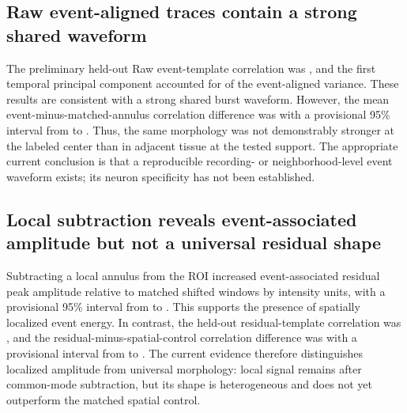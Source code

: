 \subsection{Raw event-aligned traces contain a strong shared waveform}

The preliminary held-out Raw event-template correlation was \RawHeldoutCorrelation{}, and the first temporal principal component accounted for \RawFirstPCVariance{} of the event-aligned variance. These results are consistent with a strong shared burst waveform. However, the mean event-minus-matched-annulus correlation difference was \RawAnnulusDelta{} with a provisional 95\% interval from \RawAnnulusCILow{} to \RawAnnulusCIHigh{}. Thus, the same morphology was not demonstrably stronger at the labeled center than in adjacent tissue at the tested support. The appropriate current conclusion is that a reproducible recording- or neighborhood-level event waveform exists; its neuron specificity has not been established.



\subsection{Local subtraction reveals event-associated amplitude but not a universal residual shape}

Subtracting a local annulus from the ROI increased event-associated residual peak amplitude relative to matched shifted windows by \ResidualPeakAmplitudeDelta{} intensity units, with a provisional 95\% interval from \ResidualPeakAmplitudeCILow{} to \ResidualPeakAmplitudeCIHigh{}. This supports the presence of spatially localized event energy. In contrast, the held-out residual-template correlation was \ResidualHeldoutCorrelation{}, and the residual-minus-spatial-control correlation difference was \ResidualSpatialDelta{} with a provisional interval from \ResidualSpatialCILow{} to \ResidualSpatialCIHigh{}. The current evidence therefore distinguishes localized amplitude from universal morphology: local signal remains after common-mode subtraction, but its shape is heterogeneous and does not yet outperform the matched spatial control.

